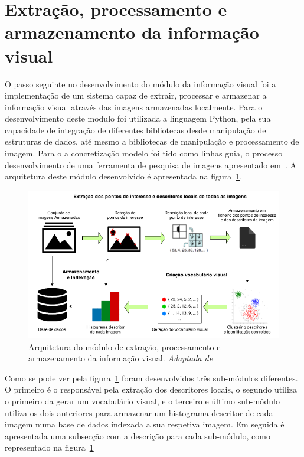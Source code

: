 \section{Extração, processamento e armazenamento da informação visual}

O passo seguinte no desenvolvimento do módulo da informação visual foi a implementação de um sistema capaz de extrair, processar e armazenar a informação visual através das imagens armazenadas localmente. Para o desenvolvimento deste modulo foi utilizada a linguagem Python, pela sua capacidade de integração de diferentes bibliotecas desde manipulação de estruturas de dados, até mesmo a bibliotecas de manipulação e processamento de imagem. Para o a concretização modelo foi tido como linhas guia, o processo desenvolvimento de uma ferramenta de pesquisa de imagens apresentado em~\cite{Solem2012}. A arquitetura deste módulo desenvolvido é apresentada na figura~\ref{fig:infovisual}.

\begin{figure}[h]
\centering
\includegraphics[width=0.95\linewidth]{./figures/infovisual}
\caption{Arquitetura do módulo de extração, processamento e armazenamento da informação visual. \textit{Adaptada de}~\cite{Bueno2011}}
\label{fig:infovisual}
\end{figure}

Como se pode ver pela figura~\ref{fig:infovisual} foram desenvolvidos três sub-módulos diferentes. O primeiro é o responsável pela extração dos descritores locais, o segundo utiliza o primeiro da gerar um vocabulário visual, e o terceiro e último sub-módulo utiliza os dois anteriores para armazenar um histograma descritor de cada imagem numa base de dados indexada a sua respetiva imagem. 
Em seguida é apresentada uma subsecção com a descrição para cada sub-módulo, como representado na figura~\ref{fig:infovisual}


